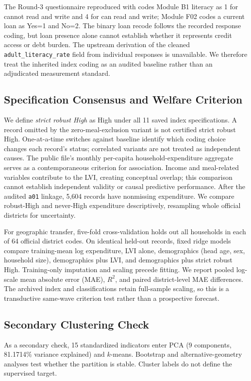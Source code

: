 \documentclass[conference,a4paper]{IEEEtran}
\begin{document}
The Round-3 questionnaire reproduced with \cite{jubayer2023fies} codes Module B1 literacy as 1 for cannot read and write and 4 for can read and write; Module F02 codes a current loan as Yes=1 and No=2. The binary loan recode follows the recorded response coding, but loan presence alone cannot establish whether it represents credit access or debt burden. The upstream derivation of the cleaned \texttt{adult\_literacy\_rate} field from individual responses is unavailable. We therefore treat the inherited index coding as an audited baseline rather than an adjudicated measurement standard.

\subsection{Specification Consensus and Welfare Criterion}
We define \emph{strict robust High} as High under all 11 saved index specifications. A record omitted by the zero-meal-exclusion variant is not certified strict robust High. One-at-a-time switches against baseline identify which coding choice changes each record's status; correlated variants are not treated as independent causes. The public file's monthly per-capita household-expenditure aggregate serves as a contemporaneous criterion for association. Income and meal-related variables contribute to the LVI, creating conceptual overlap; this comparison cannot establish independent validity or causal predictive performance. After the audited \texttt{a01} linkage, 5,604 records have nonmissing expenditure. We compare robust-High and never-High expenditure descriptively, resampling whole official districts for uncertainty.

For geographic transfer, five-fold cross-validation holds out all households in each of 64 official district codes. On identical held-out records, fixed ridge models compare training-mean log expenditure, LVI alone, demographics (head age, sex, household size), demographics plus LVI, and demographics plus strict robust High. Training-only imputation and scaling precede fitting. We report pooled log-scale mean absolute error (MAE), $R^2$, and paired district-level MAE differences. The archived index and classifications retain full-sample scaling, so this is a transductive same-wave criterion test rather than a prospective forecast.

\subsection{Secondary Clustering Check}
As a secondary check, 15 standardized indicators enter PCA (9 components, 81.1714\% variance explained) and $k$-means. Bootstrap and alternative-geometry analyses test whether the partition is stable. Cluster labels do not define the supervised target.
\end{document}
